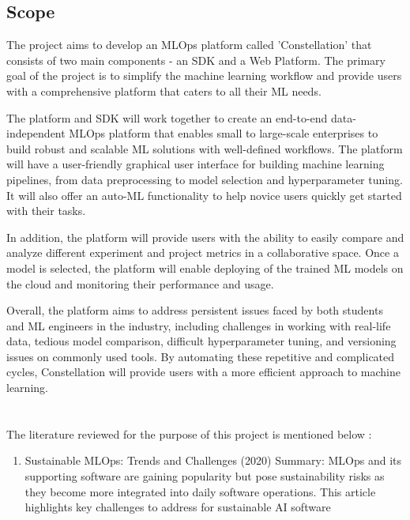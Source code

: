 \documentclass[12pt,a4paper]{report}     %
\begin{document}
\begin{normalsize}
\section {Scope}
{\setlength{\baselineskip}{1.1\baselineskip}
The project aims to develop an MLOps platform called 'Constellation' that consists of two main components - an SDK and a Web Platform. The primary goal of the project is to simplify the machine learning workflow and provide users with a comprehensive platform that caters to all their ML needs.
\par
The platform and SDK will work together to create an end-to-end data-independent MLOps platform that enables small to large-scale enterprises to build robust and scalable ML solutions with well-defined workflows. The platform will have a user-friendly graphical user interface for building machine learning pipelines, from data preprocessing to model selection and hyperparameter tuning. It will also offer an auto-ML functionality to help novice users quickly get started with their tasks.
\par
In addition, the platform will provide users with the ability to easily compare and analyze different experiment and project metrics in a collaborative space. Once a model is selected, the platform will enable deploying of the trained ML models on the cloud and monitoring their performance and usage.
\par
Overall, the platform aims to address persistent issues faced by both students and ML engineers in the industry, including challenges in working with real-life data, tedious model comparison, difficult hyperparameter tuning, and versioning issues on commonly used tools. By automating these repetitive and complicated cycles, Constellation will provide users with a more efficient approach to machine learning.
}


\newpage 
\chapter{}
{\setlength{\baselineskip}{1.1\baselineskip}
The literature reviewed for the purpose of this project is mentioned below : 
\begin{enumerate}
\item Sustainable MLOps: Trends and Challenges (2020)
\newline Summary: MLOps and its supporting software are gaining popularity but pose sustainability risks as they become more integrated into daily software operations. This article highlights key challenges to address for sustainable AI software


\end{enumerate}}
\end{normalsize}
\end{document}
